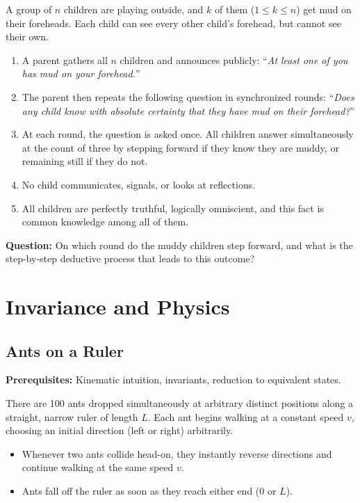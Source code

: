 \documentclass[12pt]{article}
\begin{document}
A group of $n$ children are playing outside, and $k$ of them ($1 \le k \le n$) get mud on their foreheads. Each child can see every other child's forehead, but cannot see their own.
\begin{enumerate}[label=(\roman*)]
    \item A parent gathers all $n$ children and announces publicly: ``\textit{At least one of you has mud on your forehead.}''
    \item The parent then repeats the following question in synchronized rounds: ``\textit{Does any child know with absolute certainty that they have mud on their forehead?}''
    \item At each round, the question is asked once. All children answer simultaneously at the count of three by stepping forward if they know they are muddy, or remaining still if they do not.
    \item No child communicates, signals, or looks at reflections.
    \item All children are perfectly truthful, logically omniscient, and this fact is common knowledge among all of them.
\end{enumerate}

\textbf{Question:} On which round do the muddy children step forward, and what is the step-by-step deductive process that leads to this outcome?

\section{Invariance and Physics}

\subsection{Ants on a Ruler}
\textbf{Prerequisites:} Kinematic intuition, invariants, reduction to equivalent states.

There are 100 ants dropped simultaneously at arbitrary distinct positions along a straight, narrow ruler of length $L$. Each ant begins walking at a constant speed $v$, choosing an initial direction (left or right) arbitrarily.
\begin{itemize}
    \item Whenever two ants collide head-on, they instantly reverse directions and continue walking at the same speed $v$.
    \item Ants fall off the ruler as soon as they reach either end ($0$ or $L$).
\end{itemize}
\end{document}
